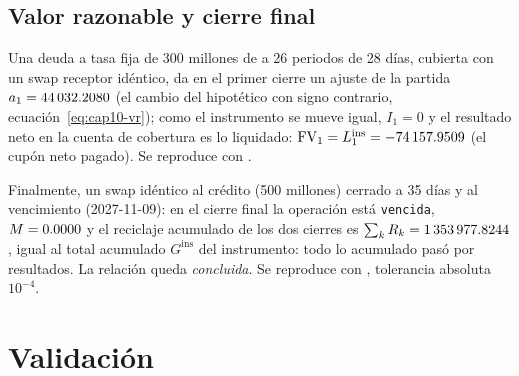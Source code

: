 \subsection{Valor razonable y cierre final}

Una deuda a tasa fija de 300 millones de \MXN a 26 periodos de 28 días, cubierta con un swap receptor idéntico, da en el
primer cierre un ajuste de la partida $a_1=\verif{cap10-vr-ajuste}{44032.2080}$ (el cambio del hipotético con signo
contrario, ecuación~\eqref{eq:cap10-vr}); como el instrumento se mueve igual, $I_1=0$ y el resultado neto en la cuenta de
cobertura es lo liquidado: $\mathrm{FV}_1=L^{\mathrm{ins}}_1=\verif{cap10-vr-resultado}{-74157.9509}$ (el cupón neto
pagado). Se reproduce con .

Finalmente, un swap idéntico al crédito (500 millones) cerrado a 35 días y al vencimiento (2027-11-09): en el cierre
final la operación está \texttt{vencida}, $M=\verif{cap10-final-reserva}{0.0000}$ y el reciclaje acumulado de los dos
cierres es $\sum_k R_k = \verif{cap10-final-reciclaje}{1353977.8244}$, igual al total acumulado $G^{\mathrm{ins}}$ del
instrumento: todo lo acumulado pasó por resultados. La relación queda \emph{concluida}. Se reproduce con
, tolerancia absoluta $10^{-4}$.

\section{Validación}\label{sec:cap10-validacion}

